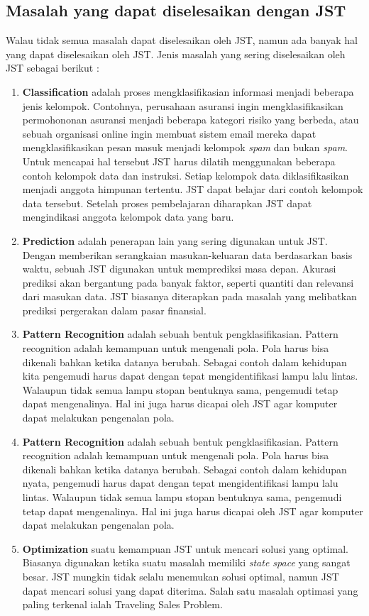 \subsection{Masalah yang dapat diselesaikan dengan JST}
Walau tidak semua masalah dapat diselesaikan oleh JST, namun ada banyak hal yang dapat diselesaikan oleh JST. Jenis masalah yang sering diselesaikan oleh JST sebagai berikut :
\begin{enumerate}
	\item \textbf{Classification} adalah proses mengklasifikasian informasi menjadi beberapa
jenis kelompok. Contohnya, perusahaan asuransi ingin mengklasifikasikan permohononan asuransi menjadi beberapa kategori risiko yang berbeda, atau sebuah organisasi online ingin membuat sistem email mereka dapat mengklasifikasikan pesan masuk menjadi kelompok \textit{spam} dan bukan \textit{spam}. Untuk mencapai hal tersebut JST harus dilatih menggunakan beberapa contoh kelompok data dan instruksi. Setiap kelompok data diklasifikasikan menjadi anggota himpunan tertentu. JST dapat belajar dari contoh kelompok data tersebut. Setelah proses pembelajaran diharapkan JST dapat mengindikasi anggota kelompok data yang baru.
	\item \textbf{Prediction} adalah penerapan lain yang sering digunakan untuk JST. Dengan memberikan serangkaian masukan-keluaran data berdasarkan basis waktu, sebuah JST
digunakan untuk memprediksi masa depan. Akurasi prediksi akan bergantung pada banyak faktor, seperti quantiti dan relevansi dari masukan data. JST biasanya diterapkan pada masalah yang melibatkan prediksi pergerakan dalam pasar finansial.
	\item \textbf{Pattern Recognition} adalah sebuah bentuk pengklasifikasian. Pattern recognition adalah kemampuan untuk mengenali pola. Pola harus bisa dikenali bahkan ketika datanya berubah. Sebagai contoh dalam kehidupan kita pengemudi harus dapat dengan tepat mengidentifikasi lampu lalu lintas. Walaupun tidak semua lampu stopan bentuknya sama, pengemudi tetap dapat mengenalinya. Hal ini juga harus dicapai oleh JST agar komputer dapat melakukan pengenalan pola.
	\item \textbf{Pattern Recognition} adalah sebuah bentuk pengklasifikasian. Pattern recognition adalah kemampuan untuk mengenali pola. Pola harus bisa dikenali bahkan ketika datanya berubah. Sebagai contoh dalam kehidupan nyata, pengemudi harus dapat dengan tepat mengidentifikasi lampu lalu lintas. Walaupun tidak semua lampu stopan bentuknya sama, pengemudi tetap dapat mengenalinya. Hal ini juga harus dicapai oleh JST agar komputer dapat melakukan pengenalan pola.
	\item \textbf{Optimization} suatu kemampuan JST untuk mencari solusi yang optimal. Biasanya digunakan ketika suatu masalah memiliki \textit{state space} yang sangat besar. JST mungkin tidak selalu menemukan solusi optimal, namun JST dapat mencari solusi yang dapat diterima. Salah satu masalah optimasi yang paling terkenal ialah Traveling Sales Problem.
\end{enumerate}
